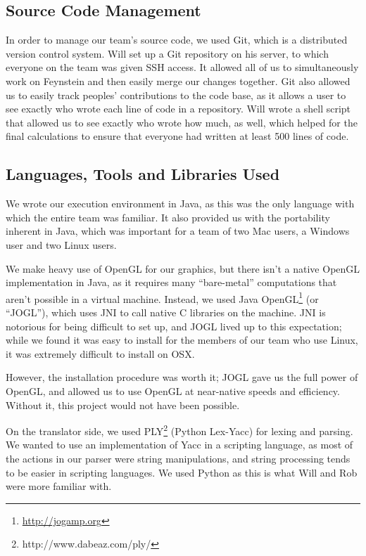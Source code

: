 \subsection{Source Code Management}

In order to manage our team's source code, we used Git, which is a
distributed version control system. Will set up a Git repository on
his server, to which everyone on the team was given SSH access. It
allowed all of us to simultaneously work on Feynstein and then easily
merge our changes together. Git also allowed us to easily track
peoples' contributions to the code base, as it allows a user to see
exactly who wrote each line of code in a repository. Will wrote a
shell script that allowed us to see exactly who wrote how much, as
well, which helped for the final calculations to ensure that everyone
had written at least 500 lines of code.

\subsection{Languages, Tools and Libraries Used}

We wrote our execution environment in Java, as this was the only
language with which the entire team was familiar. It also provided us
with the portability inherent in Java, which was important for a team
of two Mac users, a Windows user and two Linux users.

We make heavy use of OpenGL for our graphics, but there isn't a
native OpenGL implementation in Java, as it requires many
``bare-metal'' computations that aren't possible in a virtual
machine. Instead, we used Java OpenGL\footnote{
 \url{http://jogamp.org}} (or ``JOGL''), which uses JNI to call native
C libraries on the machine. JNI is notorious for being difficult to
set up, and JOGL lived up to this expectation; while we found it was
easy to install for the members of our team who use Linux, it was
extremely difficult to install on OSX. 

However, the installation procedure was worth it; JOGL gave us the
full power of OpenGL, and allowed us to use OpenGL at near-native
speeds and efficiency. Without it, this project would not have been
possible.

On the translator side, we used
PLY\footnote{http://www.dabeaz.com/ply/} (Python Lex-Yacc) for lexing
and parsing. We wanted to use an implementation of Yacc in a scripting
language, as most of the actions in our parser were string
manipulations, and string processing tends to be easier in scripting
languages. We used Python as this is what Will and Rob were more
familiar with.
